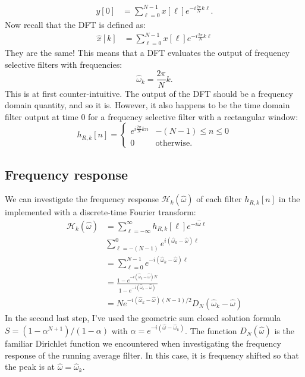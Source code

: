 \begin{align}
y[0] &= \sum_{\ell=0}^{N-1} x[\ell] e^{-i\frac{2\pi}{N}k \ell }.
\end{align}
Now recall that the DFT is defined as:
\begin{align}
\hat{x}[k] &= \sum_{\ell=0}^{N-1} x[\ell]e^{-i \frac{2\pi}{N}k \ell } 
\end{align}
They are the same! This means that a DFT evaluates the output of
frequency selective filters with frequencies:
\begin{equation}
\boxed{
\hat{\omega}_{k}=\frac{2\pi}{N}k.
}
\end{equation}
This is at first counter-intuitive. The output of the DFT should be a
frequency domain quantity, and so it is. However, it also happens to
be the time domain filter output at time $0$ for a frequency selective
filter with a rectangular window:
\begin{equation}
h_{R,k}[n] =\left\{ \begin{array}{cc}
e^{i \frac{2\pi}{N}k n} & -(N-1) \le n \le 0\\
0 & \mathrm{otherwise}.
\end{array}
\right.
\end{equation}

\subsection{Frequency response}

We can investigate the frequency response
$\mathcal{H}_{k}(\hat{\omega})$ of each filter $h_{R,k}[n]$ in
the  implemented with a discrete-time Fourier transform:
\begin{align}
\mathcal{H}_k(\hat{\omega}) &= \sum_{\ell=-\infty}^{\infty} h_{R,k}[\ell] e^{-i \hat{\omega} \ell}\\
    & \sum_{\ell=-(N-1)}^{0} e^{i (\hat{\omega}_{k}-\hat{\omega}) \ell}\\
    &= \sum_{\ell=0}^{N-1} e^{-i (\hat{\omega}_{k}-\hat{\omega}) \ell}\\
    &= \frac{1-e^{-i (\hat{\omega}_{k}-\hat{\omega})N}}{1-e^{-i (\hat{\omega}_k-\hat{\omega})}}\\
    &= N e^{-i (\hat{\omega}_{k}-\hat{\omega})(N-1)/2}  D_{N}(\hat{\omega}_k-\hat{\omega})%
\end{align}
In the second last step, I've used the geometric sum closed solution
formula $S=(1-\alpha^{N+1})/(1-\alpha)$ with $\alpha=e^{-i
(\hat{\omega}-\hat{\omega}_{k})}$. The function $D_N(\hat{\omega})$ is
the familiar Dirichlet function we encountered when investigating the
frequency response of the running average filter. In this case, it is
frequency shifted so that the peak is at $\hat{\omega}=\hat{\omega}_k$.

